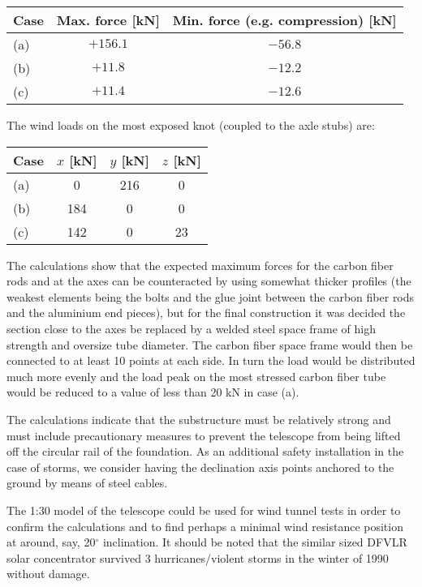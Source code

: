 \begin{center}
\begin{tabular}{|l|c|c|}
\hline
Case & Max. force [kN] & Min. force (e.g. compression) [kN] \\ \hline
(a) & $+156.1$ & $-56.8$ \\ \hline
(b) & $+11.8$ & $-12.2$ \\ \hline
(c) & $+11.4$ & $-12.6$ \\ \hline
\end{tabular}
\end{center}

The wind loads on the most exposed knot (coupled to the axle stubs) are:

\begin{center}
\begin{tabular}{|l|c|c|c|}
\hline
Case & $x$ [kN] & $y$ [kN] & $z$ [kN] \\ \hline
(a) & 0 & 216 & 0 \\ \hline
(b) & 184 & 0 & 0 \\ \hline
(c) & 142 & 0 & 23 \\ \hline
\end{tabular}
\end{center}

The calculations show that the expected maximum forces for the carbon fiber
rods and at the axes can be counteracted by using somewhat thicker profiles
(the weakest elements being the bolts and the glue joint between the carbon
fiber rods and the aluminium end pieces), but for the final construction it
was decided the section close to the axes be replaced by a welded steel
space frame of high strength and oversize tube diameter. The carbon fiber
space frame would then be connected to at least 10 points at each side. In
turn the load would be distributed much more evenly and the load peak on the
most stressed carbon fiber tube would be reduced to a value of less than 20
kN in case (a).

The calculations indicate that the substructure must be relatively strong
and must include precautionary measures to prevent the telescope from being
lifted off the circular rail of the foundation. As an additional safety
installation in the case of storms, we consider having the declination axis
points anchored to the ground by means of steel cables.

The 1:30 model of the telescope could
be used for wind tunnel tests in order to
confirm the calculations and to find perhaps a minimal wind resistance
position at around, say, 20$^\circ$ inclination. It should be noted that the
similar sized DFVLR solar concentrator survived 3 hurricanes/violent storms
in the winter of 1990 without damage.

